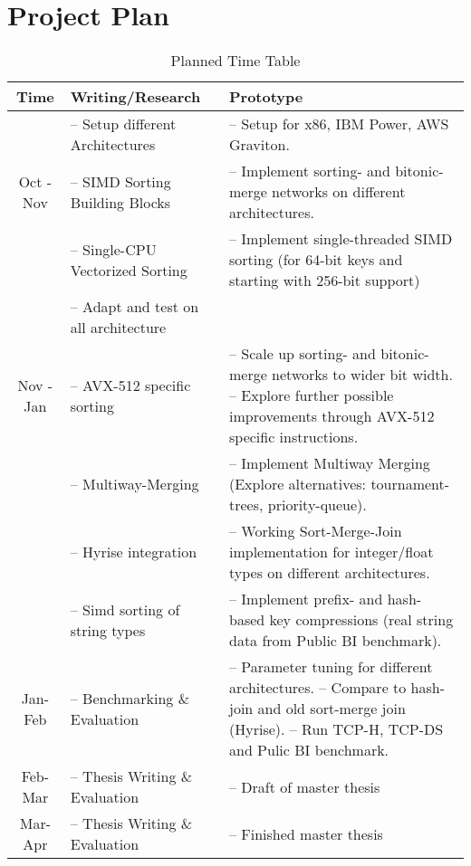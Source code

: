 \newpage
\section{Project Plan}
\label{sec:plan}


\begin{table}[h!]
    \centering
    \begin{tabular}{ | c | m{} | m{} | }
        \hline
        \textbf{Time} & \textbf{Writing/Research} & \textbf{Prototype} \\
        \hline
                      & -- Setup different Architectures &  -- Setup for x86, IBM Power, AWS Graviton. \\
        Oct - Nov  & -- SIMD Sorting Building Blocks & -- Implement sorting- and bitonic-merge networks on different architectures.\\ 
                   & -- Single-CPU Vectorized Sorting & -- Implement single-threaded SIMD sorting (for 64-bit keys and starting with 256-bit support) \\ 
                   & -- Adapt and test on all architecture \\
        \hline
        Nov - Jan & -- AVX-512 specific sorting & -- Scale up sorting- and bitonic-merge networks to wider bit width. \newline -- Explore further possible improvements through AVX-512 specific instructions. \\
                  & -- Multiway-Merging & -- Implement Multiway Merging (Explore alternatives: tournament-trees, priority-queue). \\    
                  & -- Hyrise integration & -- Working Sort-Merge-Join implementation for integer/float types on different architectures.\\ 
                  & -- Simd sorting of string types & -- Implement prefix- and hash-based key compressions (real string data from Public BI benchmark).\\ 
        \hline
        Jan-Feb & -- Benchmarking \& Evaluation & -- Parameter tuning for different architectures. \newline 
                                                   -- Compare to hash-join and old sort-merge join (Hyrise). \newline
                                                   -- Run TCP-H, TCP-DS and Pulic BI benchmark. \\
        \hline
        Feb-Mar & -- Thesis Writing \& Evaluation & -- Draft of master thesis\\
        \hline
        Mar-Apr & -- Thesis Writing \& Evaluation & -- Finished master thesis \\
       \hline 
    \end{tabular}
    \caption{Planned Time Table}
    \label{tab:time-table}
\end{table}
